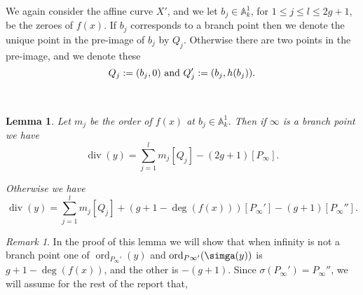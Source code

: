 \documentclass[11pt]{article} %
\theoremstyle{plain}
\newtheorem{lem}[defn]{Lemma}
\theoremstyle{remark}
\newtheorem*{rem}{Remark}
\DeclareMathOperator{\ord}{ord}
\DeclareMathOperator{\di}{div}
\begin{document}
We again consider the affine curve $X'$, and we let $b_j \in \mathbb A_k^1$, for $1\leq j\leq l \leq 2g+1$, be the zeroes of $f(x)$.
If $b_j$ corresponds to a branch point then we denote the unique point in the pre-image of $b_j$ by $Q_j$.
Otherwise there are two points in the pre-image, and we denote these \[ Q_j:=(b_j,0)\ {\rm and}\ Q_j':=(b_j,h(b_j)).\]


~


\begin{lem}\label{ychar2}
 Let $m_j$ be the order of $f(x)$ at $b_j\in \mathbb A_k^1$.
 Then if $\infty$ is a branch point we have
 \[
  \di(y) = \sum_{j=1}^l m_j[Q_j] - (2g+1)[P_\infty].
 \]

 Otherwise we have
 \begin{equation*}
  \di(y) = \sum_{j=1}^l m_j[Q_j] + (g + 1-\deg(f(x)))[P_\infty'] -(g+1)[P_\infty''].
 \end{equation*}
\end{lem}
\begin{rem}
 In the proof of this lemma we will show that when infinity is not a branch point one of $\ord_{P_\infty'}(y)$ and $\ord_{P\infty'}(\simga(y))$ is $g + 1-\deg(f(x))$, and the other is $-(g+1)$.
 Since $\sigma(P_\infty') = P_\infty''$, we will assume for the rest of the report that, 
 
\end{rem}
\end{document}
